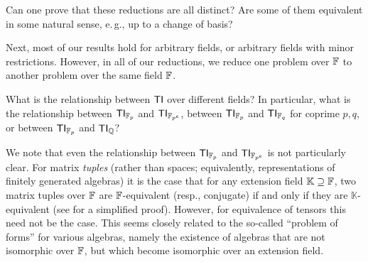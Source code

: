 \documentclass[11pt]{article}
\begin{document}
Can one prove that these reductions are all distinct? Are some of them equivalent in some natural sense, e.\,g., up to a change of basis?

Next, most of our results hold for arbitrary fields, or arbitrary fields with 
minor restrictions. However, in all of our reductions, we reduce one problem over 
$\mathbb{F}$ to another problem over the same field $\mathbb{F}$. 

\begin{question}
What is the relationship between $\mathsf{TI}$ over different fields? In particular, 
what is the relationship between $\mathsf{TI}_{\mathbb{F}_p}$ and $\mathsf{TI}_{\mathbb{F}_{p^e}}$, between $\mathsf{TI}_{\mathbb{F}_p}$ and $\mathsf{TI}_{\mathbb{F}_q}$ for coprime 
$p,q$, or between $\mathsf{TI}_{\mathbb{F}_p}$ and $\mathsf{TI}_{\mathbb{Q}}$?
\end{question}

We note that even the relationship between $\mathsf{TI}_{\mathbb{F}_p}$ and 
$\mathsf{TI}_{\mathbb{F}_{p^e}}$ is not particularly clear. For matrix \emph{tuples} (rather than 
spaces; equivalently, representations of finitely generated algebras) it is the 
case that for any extension field $\mathbb{K} \supseteq \mathbb{F}$, two matrix tuples 
over $\mathbb{F}$ are $\mathbb{F}$-equivalent (resp., conjugate) if and only if they are 
$\mathbb{K}$-equivalent \cite{KL86} (see \cite{dSPFields} for a simplified proof). 
However, for equivalence of tensors this need not be the case. This seems closely related to the so-called ``problem of forms'' for various algebras, namely the existence of algebras that are not isomorphic over $\mathbb{F}$, but which become isomorphic over an extension field.
\end{document}
